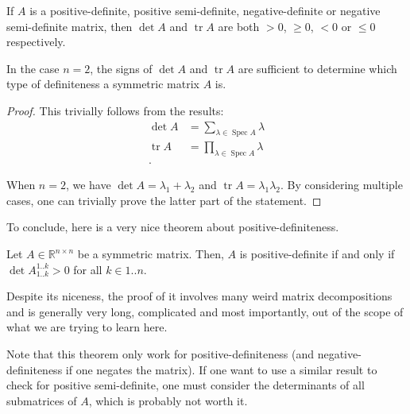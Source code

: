 \begin{corollary}
\label{cor:Determinant and Trace of a definite matrix}
  If \( A \) is a positive-definite, positive semi-definite, negative-definite
  or negative semi-definite matrix, then \( \det A \) and \( \operatorname{tr} A
  \) are both \( > 0 \), \( \ge 0 \),
  \( < 0 \) or \( \le 0 \) respectively.

  In the case \( n = 2 \), the signs of \( \det A \) and \( \operatorname{tr} A
  \) are sufficient to determine which type of definiteness a symmetric matrix
  \( A \) is.
\end{corollary}

\begin{proof}
  This trivially follows from the results:
  \begin{align*}
    \det A &= \sum_{\lambda \in \operatorname{Spec} A} \lambda\\
    \operatorname{tr} A &= \prod_{\lambda \in \operatorname{Spec} A} \lambda\\
  .\end{align*}

  When \( n = 2 \), we have \( \det A = \lambda_{1} + \lambda_{2} \) and \(
  \operatorname{tr} A = \lambda_{1}\lambda_{2} \). By considering multiple
  cases, one can trivially prove the latter part of the statement.
\end{proof}

To conclude, here is a very nice theorem about positive-definiteness.

\begin{theorem}
\label{thr:Sylvester's criterion}
  Let \( A \in \mathbb{R}^{n\times n} \) be a symmetric matrix. Then, \( A \) is
  positive-definite if and only if \( \det A^{1..k}_{1..k} > 0 \) for all \( k
  \in 1..n \).
\end{theorem}

Despite its niceness, the proof of it involves many weird matrix decompositions
and is generally very long, complicated and most importantly, out of the scope
of what we are trying to learn here.

Note that this theorem only work for positive-definiteness (and
negative-definiteness if one negates the matrix). If one want to use
a similar result to check for positive semi-definite, one must consider the
determinants of all submatrices of \( A \), which is probably not worth it.


